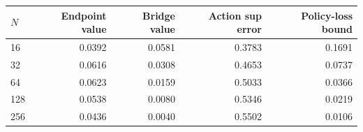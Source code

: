\begin{tabular}{lrrrr}
\toprule
$N$ & Endpoint value & Bridge value & Action sup error & Policy-loss bound \\
\midrule
16 & 0.0392 & 0.0581 & 0.3783 & 0.1691 \\
32 & 0.0616 & 0.0308 & 0.4653 & 0.0737 \\
64 & 0.0623 & 0.0159 & 0.5033 & 0.0366 \\
128 & 0.0538 & 0.0080 & 0.5346 & 0.0219 \\
256 & 0.0436 & 0.0040 & 0.5502 & 0.0106 \\
\bottomrule
\end{tabular}
